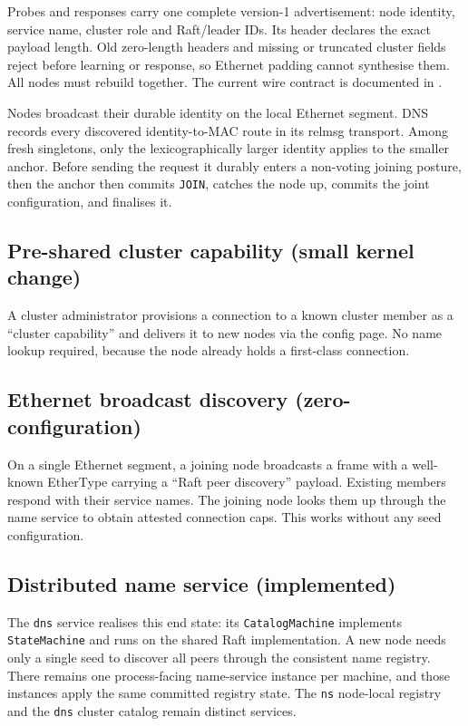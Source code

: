 Probes and responses carry one complete version-1 advertisement: node identity,
service name, cluster role and Raft/leader IDs. Its header declares the exact
payload length. Old zero-length headers and missing or truncated cluster
fields reject before learning or response, so Ethernet padding cannot synthesise
them. All nodes must rebuild together. The current wire contract is documented
in .

Nodes broadcast their durable identity on the local Ethernet segment. DNS
records every discovered identity-to-MAC route in its relmsg transport. Among
fresh singletons, only the lexicographically larger identity applies to the
smaller anchor. Before sending the request it durably enters a non-voting
joining posture, then the anchor then commits \texttt{JOIN}, catches the node up,
commits the joint configuration, and finalises it.

\subsection{Pre-shared cluster capability (small kernel change)}

A cluster administrator provisions a connection to a known cluster member as a
``cluster capability'' and delivers it to new nodes via the config page.
No name lookup required, because the node already holds a first-class connection.

\subsection{Ethernet broadcast discovery (zero-configuration)}

On a single Ethernet segment, a joining node broadcasts a frame with a
well-known EtherType carrying a ``Raft peer discovery'' payload. Existing
members respond with their service names. The joining node looks them up
through the name service to obtain attested connection caps. This works
without any seed configuration.

\subsection{Distributed name service (implemented)}

The \texttt{dns} service realises this end state: its \texttt{CatalogMachine}
implements \texttt{StateMachine} and runs on the shared Raft implementation. A new
node needs only a single seed to discover all peers through the consistent
name registry. There remains one process-facing name-service instance per
machine, and those instances apply the same committed registry state. The
\texttt{ns} node-local registry and the \texttt{dns} cluster catalog remain
distinct services.

